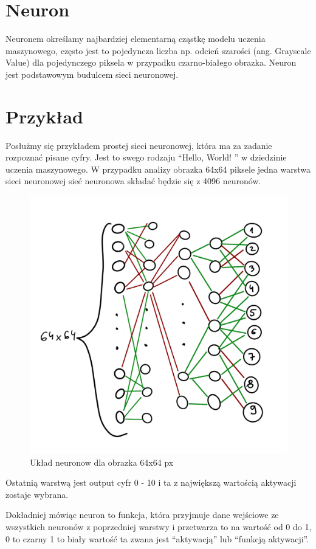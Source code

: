 \documentclass[brudnopis]{xmgr}
\begin{document}
\section{Neuron  \label{s:dsssl}}
Neuronem określamy najbardziej elementarną cząstkę modelu uczenia maszynowego, często jest to pojedyncza liczba np. odcień szarości (ang. Grayscale Value) dla pojedynczego piksela w przypadku czarno-białego obrazka. Neuron jest podstawowym budulcem sieci neuronowej. 


\section{Przykład  \label{s:dsssl}}

Posłużmy się przykładem prostej sieci neuronowej, która ma za zadanie rozpoznać pisane cyfry. Jest to swego rodzaju “Hello, World! ” w dziedzinie uczenia maszynowego.
W przypadku analizy obrazka 64x64 piksele jedna warstwa sieci neuronowej sieć neuronowa składać będzie się z 4096 neuronów.


\begin{figure}[!tbh]
\centering
\includegraphics[width=.8\hsize]{fig/2}
\caption{Układ neuronow dla obrazka 64x64 px\label{RYS.2}}
\end{figure}



Ostatnią warstwą jest output cyfr 0 - 10 i ta z największą wartością aktywacji zostaje wybrana. 

Dokładniej mówiąc neuron to funkcja, która przyjmuje dane wejściowe ze wszystkich neuronów z poprzedniej warstwy i przetwarza to na wartość od 0 do 1, 0 to czarny 1 to biały wartość ta zwana jest “aktywacją” lub “funkcją aktywacji”.
\end{document}
